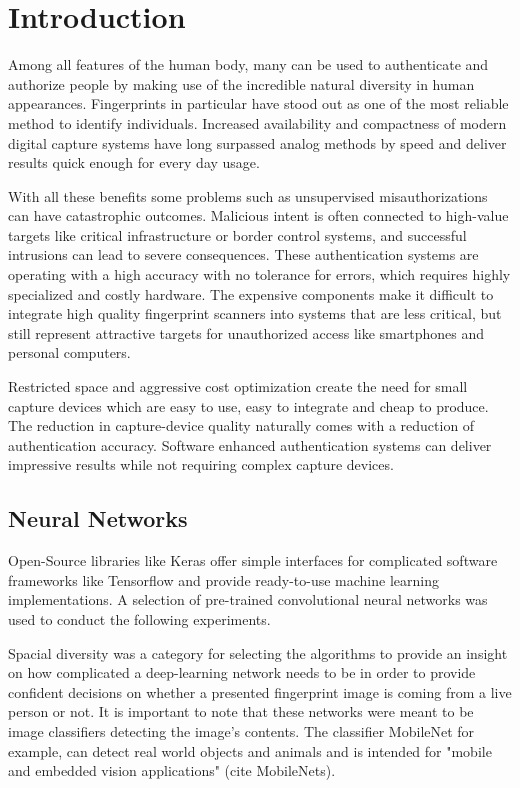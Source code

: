 \section{Introduction}
Among all features of the human body, many can be used to authenticate and authorize people by making use of the incredible natural diversity in human appearances. 
Fingerprints in particular have stood out as one of the most reliable method to identify individuals.
Increased availability and compactness of modern digital capture systems have long surpassed analog methods by speed and deliver results quick enough for every day usage.

With all these benefits some problems such as unsupervised misauthorizations can have catastrophic outcomes.
Malicious intent is often connected to high-value targets like critical infrastructure or border control systems, and successful intrusions can lead to severe consequences.
These authentication systems are operating with a high accuracy with no tolerance for errors, which requires highly specialized and costly hardware.
The expensive components make it difficult to integrate high quality fingerprint scanners into systems that are less critical, but still represent attractive targets for unauthorized access like smartphones and personal computers.

Restricted space and aggressive cost optimization create the need for small capture devices which are easy to use, easy to integrate and cheap to produce. 
The reduction in capture-device quality naturally comes with a reduction of authentication accuracy.
Software enhanced authentication systems can deliver impressive results while not requiring complex capture devices.

\medskip
\subsection{Neural Networks}
Open-Source libraries like Keras offer simple interfaces for complicated software frameworks like Tensorflow and provide ready-to-use machine learning implementations.
A selection of pre-trained convolutional neural networks was used to conduct the following experiments.

\medskip\noindent
Spacial diversity was a category for selecting the algorithms to provide an insight on how complicated a deep-learning network needs to be in order to provide confident decisions on whether a presented fingerprint image is coming from a live person or not.
It is important to note that these networks were meant to be image classifiers detecting the image's contents.
The classifier MobileNet for example, can detect real world objects and animals and is intended for "mobile and embedded vision applications" (cite MobileNets).


